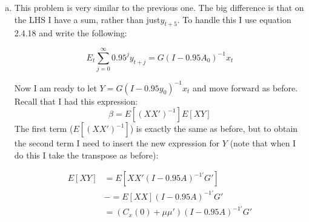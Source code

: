 \documentclass{homework}
\begin{document}
\begin{homeworkProblem}[Problem 2.4]
{\begin{enumerate}[a.]
        \begin{align*}
          \beta = \left(C_x(0) + \mu\mu' \right)^{-1}  \left( C_x(0)' A^{5'} + \mu \mu' \right) G'
        \end{align*}

        I will apply this expression to each parameterization from part b:

        \begin{enumerate}[i.]
          \item $\beta = \left[\begin{matrix} 0.739 &  -0.260 &  -0.000 &  0.000 &  5.216 \end{matrix}\right]$
          \item $\beta = \left[\begin{matrix} 0.739 &  -0.260 &  -0.000 &  0.000 &  5.216 \end{matrix}\right]$
          \item $\beta = \left[\begin{matrix} 0.590 &  -0.000 &  -0.000 &  0.000 &  2.048 \end{matrix}\right]$
          \item $\beta = \left[\begin{matrix} 0.200 &  0.020 &  0.004 &  0.251 &  2.624  \end{matrix}\right]$
          \item  Not all eigenvalues are less than 1 in modulus, so there is no set of covariance stationary initial conditions, so there is no answer to this problem.
        \end{enumerate} \qed

        \item This problem is very similar to the previous one. The big difference is that on the LHS I have a sum, rather than just$y_{t+5}$. To handle this I use equation 2.4.18 and write the following:

          $$E_t \sum_{j=0}^{\infty} 0.95^j y_{t+j} = G(I - 0.95 A_0)^{-1} x_t $$

          Now I am ready to let $Y = G(I - 0.95 y_0)^{-1} x_t$ and move forward as before. Recall that I had this expression: $$\beta = E\left[(XX')^{-1}\right] E[XY]$$ The first term ($E\left[(XX')^{-1}\right]$) is exactly the same as before, but to obtain the second term I need to insert the new expression for $Y$ (note that when I do this I take the transpose as before):

          \begin{align*}
            E[XY] &= E \left[XX' (I - 0.95A)^{-1'}  G' \right] \\
              &-= E[XX] (I - 0.95A)^{-1'}  G' \\
              &= \left(C_x(0) + \mu\mu' \right) (I - 0.95A)^{-1'}  G'
          \end{align*}


\end{enumerate}}
\end{homeworkProblem}
\end{document}
